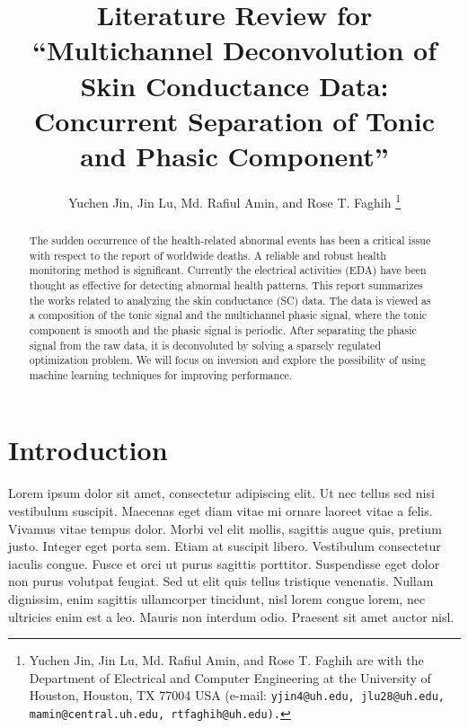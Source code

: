 \documentclass[10pt,conference]{ieeeconf}
\begin{document}
\title{Literature Review for ``Multichannel Deconvolution of Skin Conductance Data: Concurrent Separation of Tonic and Phasic Component''}


\author{Yuchen Jin, Jin Lu, Md. Rafiul Amin, and Rose T. Faghih \thanks{Yuchen Jin, Jin Lu, Md. Rafiul Amin, and Rose T. Faghih are with the Department of Electrical and Computer Engineering at the University of Houston, Houston, TX 77004 USA (e-mail: \tt\small  yjin4@uh.edu, jlu28@uh.edu, mamin@central.uh.edu, rtfaghih@uh.edu).} 
}

\maketitle

\begin{abstract}

The sudden occurrence of the health-related abnormal events has been a critical issue with respect to the report of worldwide deaths. A reliable and robust health monitoring method is significant. Currently the electrical activities (EDA) have been thought as effective for detecting abnormal health patterns. This report summarizes the works related to analyzing the skin conductance (SC) data. The data is viewed as a composition of the tonic signal and the multichannel phasic signal, where the tonic component is smooth and the phasic signal is periodic. After separating the phasic signal from the raw data, it is deconvoluted by solving a sparsely regulated optimization problem. We will focus on inversion and explore the possibility of using machine learning techniques for improving performance.

\end{abstract}

\section{Introduction} \label{introduction}

Lorem ipsum dolor sit amet, consectetur adipiscing elit. Ut nec tellus sed nisi vestibulum suscipit. Maecenas eget diam vitae mi ornare laoreet vitae a felis. Vivamus vitae tempus dolor. Morbi vel elit mollis, sagittis augue quis, pretium justo. Integer eget porta sem. Etiam at suscipit libero. Vestibulum consectetur iaculis congue. Fusce et orci ut purus sagittis porttitor. Suspendisse eget dolor non purus volutpat feugiat. Sed ut elit quis tellus tristique venenatis. Nullam dignissim, enim sagittis ullamcorper tincidunt, nisl lorem congue lorem, nec ultricies enim est a leo. Mauris non interdum odio. Praesent sit amet auctor nisl.
\end{document}
